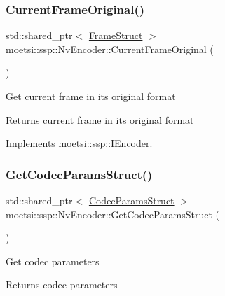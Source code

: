 \mbox{\label{classmoetsi_1_1ssp_1_1NvEncoder_a56baf331eae448da89ee54b69fec170c}} 
\subsubsection{\texorpdfstring{Current\+Frame\+Original()}{CurrentFrameOriginal()}}
{\footnotesize\ttfamily std\+::shared\+\_\+ptr$<$ \hyperlink{structmoetsi_1_1ssp_1_1FrameStruct}{Frame\+Struct} $>$ moetsi\+::ssp\+::\+Nv\+Encoder\+::\+Current\+Frame\+Original (\begin{DoxyParamCaption}{ }\end{DoxyParamCaption})\hspace{0.3cm}{\ttfamily [virtual]}}

Get current frame in its original format \begin{DoxyReturn}{Returns}
current frame in its original format 
\end{DoxyReturn}


Implements \hyperlink{classmoetsi_1_1ssp_1_1IEncoder_ab60bdaae0a85289dfa31a12bab533dc0}{moetsi\+::ssp\+::\+I\+Encoder}.

\mbox{\label{classmoetsi_1_1ssp_1_1NvEncoder_aa6229a43b12d2f27e27f518fc2229b61}} 
\subsubsection{\texorpdfstring{Get\+Codec\+Params\+Struct()}{GetCodecParamsStruct()}}
{\footnotesize\ttfamily std\+::shared\+\_\+ptr$<$ \hyperlink{structmoetsi_1_1ssp_1_1CodecParamsStruct}{Codec\+Params\+Struct} $>$ moetsi\+::ssp\+::\+Nv\+Encoder\+::\+Get\+Codec\+Params\+Struct (\begin{DoxyParamCaption}{ }\end{DoxyParamCaption})\hspace{0.3cm}{\ttfamily [virtual]}}

Get codec parameters \begin{DoxyReturn}{Returns}
codec parameters 
\end{DoxyReturn}


